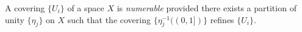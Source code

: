 A covering $\{U_i\}$ of a space $X$ is \textit{numerable} provided there exists a partition of unity $\{\eta_j\}$ on $X$ such that the covering $\{\eta_j^{-1}((0,1])\}$ refines $\{U_i\}$.
